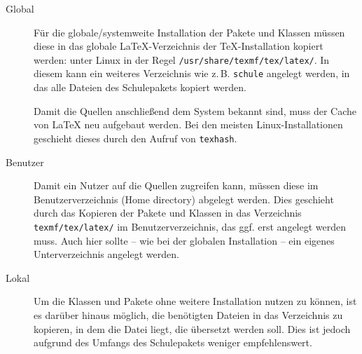 \begin{description}
\item[Global]
	Für die globale/systemweite Installation der Pakete und
	Klassen	müssen diese in das globale \LaTeX-Verzeichnis der
	\TeX-Installation kopiert werden: unter Linux in der Regel
	\texttt{/usr/share/texmf/tex/latex/}. In diesem kann ein
	weiteres Verzeichnis wie z.\,B. \texttt{schule} angelegt
	werden, in das alle Dateien des Schulepakets
	kopiert werden.

	Damit die Quellen anschließend dem System bekannt sind, muss
	der Cache von \LaTeX{} neu aufgebaut werden. Bei den meisten
	Linux-Installationen geschieht dieses durch den Aufruf von
	\texttt{texhash}.

\item[Benutzer]
	Damit ein Nutzer auf die Quellen zugreifen kann,
	müssen diese im Benutzerverzeichnis (Home directory)
	abgelegt werden. Dies geschieht durch das Kopieren der
	Pakete und Klassen in das Verzeichnis
	\texttt{texmf/tex/latex/} im Benutzerverzeichnis, das ggf.
	erst angelegt werden muss. Auch hier sollte -- wie bei der
	globalen Installation -- ein eigenes Unterverzeichnis
	angelegt werden.

\item[Lokal]
	Um die Klassen und Pakete ohne weitere Installation
	nutzen zu können, ist es darüber hinaus möglich, die
	benötigten Dateien in das Verzeichnis zu kopieren, in dem
	die Datei liegt, die übersetzt werden soll. Dies ist jedoch
	aufgrund des Umfangs des Schulepakets weniger empfehlenswert.
\end{description}

